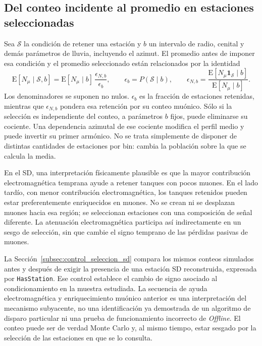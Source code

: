 \subsection{Del conteo incidente al promedio en estaciones seleccionadas}
\label{subsec:respuesta_seleccion}

Sea $\mathcal S$ la condición de retener una estación y $b$ un intervalo de radio, cenital y demás parámetros de lluvia, incluyendo el azimut. El promedio antes de imponer esa condición y el promedio seleccionado están relacionados por la identidad
\begin{equation}
\mathrm E[N_\mu\mid\mathcal S,b]
=\mathrm E[N_\mu\mid b]\,
\frac{\epsilon_{N,b}}{\epsilon_b},\qquad
\epsilon_b=P(\mathcal S\mid b),\qquad
\epsilon_{N,b}=\frac{\mathrm E[N_\mu\mathbf1_{\mathcal S}\mid b]}
                       {\mathrm E[N_\mu\mid b]}.
\label{eq:fen2026:seleccion}
\end{equation}
Los denominadores se suponen no nulos. $\epsilon_b$ es la fracción de estaciones retenidas, mientras que $\epsilon_{N,b}$ pondera esa retención por su conteo muónico. Sólo si la selección es independiente del conteo, a parámetros $b$ fijos, puede eliminarse su cociente. Una dependencia azimutal de ese cociente modifica el perfil medio y puede invertir su primer armónico. No se trata simplemente de disponer de distintas cantidades de estaciones por bin: cambia la población sobre la que se calcula la media.

En el SD, una interpretación físicamente plausible es que la mayor contribución electromagnética temprana ayude a retener tanques con pocos muones. En el lado tardío, con menor contribución electromagnética, los tanques retenidos pueden estar preferentemente enriquecidos en muones. No se crean ni se desplazan muones hacia esa región; se seleccionan estaciones con una composición de señal diferente. La atenuación electromagnética participa así indirectamente en un sesgo de selección, sin que cambie el signo temprano de las pérdidas pasivas de muones.

La Sección~\ref{subsec:control_seleccion_sd} compara los mismos conteos simulados antes y después de exigir la presencia de una estación SD reconstruida, expresada por \texttt{HasStation}. Ese control establece el cambio de signo asociado al condicionamiento en la muestra estudiada. La secuencia de ayuda electromagnética y enriquecimiento muónico anterior es una interpretación del mecanismo subyacente, no una identificación ya demostrada de un algoritmo de disparo particular ni una prueba de funcionamiento incorrecto de \textit{Offline}. El conteo puede ser de verdad Monte Carlo y, al mismo tiempo, estar sesgado por la selección de las estaciones en que se lo consulta.

